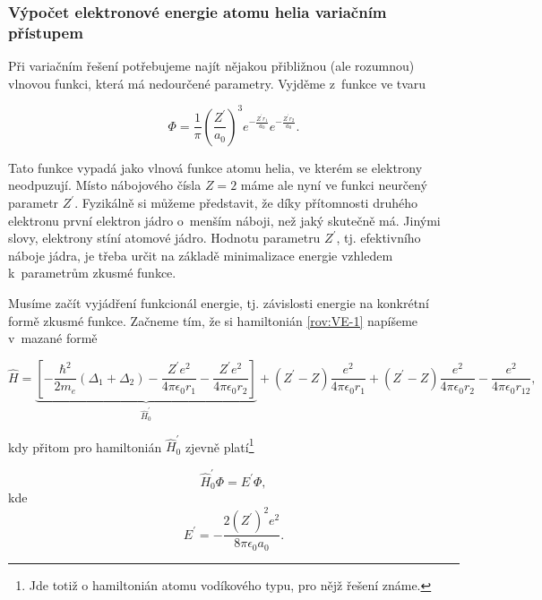 \subsubsection{Výpočet elektronové energie atomu helia variačním přístupem}

Při variačním řešení potřebujeme najít nějakou přibližnou (ale rozumnou) vlnovou funkci, která má nedourčené parametry. Vyjděme z~funkce ve tvaru


\begin{equation}
\Phi = \frac{1}{\pi} \left(\frac{Z^{\prime}}{a_0} \right)^3 e^{-\frac{Z^{\prime} r_1}{a_0}} e^{-\frac{Z^{\prime} r_2}{a_0}}.
\label{rov:VE-16}
\end{equation}

Tato funkce vypadá jako vlnová funkce atomu helia, ve kterém se elektrony neodpuzují. Místo nábojového čísla $Z = 2$ máme ale nyní ve funkci neurčený parametr $Z^{\prime}$. Fyzikálně si můžeme představit, že díky přítomnosti druhého elektronu  první elektron jádro o~menším náboji, než jaký skutečně má. Jinými slovy, elektrony stíní atomové jádro. Hodnotu parametru $Z^{\prime}$, tj. efektivního náboje jádra, je třeba určit na základě minimalizace energie vzhledem k~parametrům zkusmé funkce. 

Musíme začít vyjádření funkcionál energie, tj. závislosti energie na konkrétní formě zkusmé funkce. Začneme tím, že si hamiltonián  \eqref{rov:VE-1} napíšeme v~mazané formě

\begin{equation}
\hat{H} = \underbrace{\left[ - \frac{\hbar^2}{2 m_e} (\Delta_1 + \Delta_2) - \frac{Z^{\prime} e^2}{4 \pi \epsilon_0 r_1} - \frac{Z^{\prime} e^2}{4 \pi \epsilon_0 r_2} \right]}_{\hat{H}_0^{\prime}} + (Z^{\prime} - Z) \frac{e^2}{4 \pi \epsilon_0 r_1} + (Z^{\prime} - Z) \frac{e^2}{4 \pi \epsilon_0 r_2} - \frac{e^2}{4 \pi \epsilon_0 r_{12}} ,
\label{rov:VE-17}
\end{equation}

\noindent kdy přitom pro hamiltonián $\hat{H}_0^{\prime}$ zjevně platí\footnote{Jde totiž o hamiltonián atomu vodíkového typu, pro nějž řešení známe.}

\begin{equation}
\hat{H}_0^{\prime} \Phi = E^{\prime} \Phi,
\label{rov:VE-18}
\end{equation}
kde
\begin{equation}
E^{\prime} = - \frac{2 (Z^{\prime})^2 e^2}{8 \pi \epsilon_0 a_0}. \nonumber
\end{equation}

